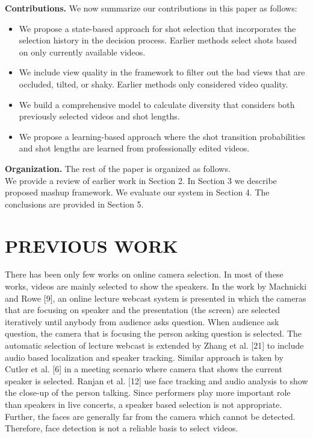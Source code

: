\documentclass{sig-alternate-05-2015}
\begin{document}
\textbf{Contributions.}
We now summarize our contributions in this paper
as follows:
\begin{itemize}
\item We propose a state-based approach for shot selection that incorporates the selection history in the decision process. Earlier methods select shots based on only currently available videos.
\item We include view quality in the framework to filter out the bad views that are occluded, tilted, or shaky. Earlier methods only considered video quality.
\item We build a comprehensive model to calculate diversity that considers both previously selected videos and shot lengths.
\item We propose a learning-based approach where the shot transition probabilities and shot lengths are learned from professionally edited videos.
\end{itemize}

\textbf{Organization.}
The rest of the paper is organized as follows.\\
We provide a review of earlier work in Section 2. In Section 3 we describe proposed mashup framework. We evaluate our system in Section 4. The conclusions are provided in Section 5.

\section{PREVIOUS WORK}
There has been only few works on online camera selection. In
most of these works, videos are mainly selected to show the speakers.
In the work by Machnicki and Rowe [9], an online lecture
webcast system is presented in which the cameras that are focusing
on speaker and the presentation (the screen) are selected iteratively
until anybody from audience asks question. When audience ask
question, the camera that is focusing the person asking question is
selected. The automatic selection of  lecture webcast
is extended by Zhang et al. [21] to include audio based localization
and speaker tracking. Similar approach is taken by Cutler et al. [6]
in a meeting scenario where camera that shows the current speaker
is selected. Ranjan et al. [12] use face tracking and audio analysis
to show the close-up of the person talking. Since performers
play more important role than speakers in live concerts, a speaker
based selection is not appropriate. Further, the faces are generally
far from the camera which cannot be detected. Therefore, face detection
is not a reliable basis to select videos.
\end{document}
